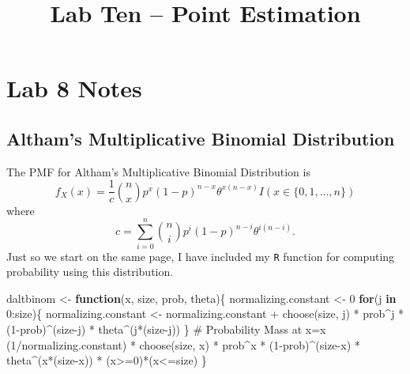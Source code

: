 \documentclass[
]{article}
\title{Lab Ten -- Point Estimation}
\author{}
\date{}
\newenvironment{Shaded}{\begin{snugshade}}{\end{snugshade}}
\newcommand{\CommentTok}[1]{\textcolor[rgb]{0.37,0.37,0.37}{#1}}
\newcommand{\ControlFlowTok}[1]{\textcolor[rgb]{0.00,0.23,0.31}{\textbf{#1}}}
\newcommand{\DecValTok}[1]{\textcolor[rgb]{0.68,0.00,0.00}{#1}}
\newcommand{\FunctionTok}[1]{\textcolor[rgb]{0.28,0.35,0.67}{#1}}
\newcommand{\NormalTok}[1]{\textcolor[rgb]{0.00,0.23,0.31}{#1}}
\newcommand{\OtherTok}[1]{\textcolor[rgb]{0.00,0.23,0.31}{#1}}
\newcommand{\SpecialCharTok}[1]{\textcolor[rgb]{0.37,0.37,0.37}{#1}}
\begin{document}
\maketitle


\normalsize

\normalsize

\section{Lab 8 Notes}\label{lab-8-notes}

\subsection{Altham's Multiplicative Binomial
Distribution}\label{althams-multiplicative-binomial-distribution}

The PMF for Altham's Multiplicative Binomial Distribution is
\[f_X(x) = \frac{1}{c} {n \choose x} p^x (1-p)^{n-x} \theta^{x(n-x)}I(x \in \{0, 1, ..., n\})\]
where
\[c = \sum_{i=0}^n {n \choose i} p^i (1-p)^{n-i} \theta^{i(n-i)}.\] Just
so we start on the same page, I have included my \texttt{R} function for
computing probability using this distribution.

\normalsize

\begin{Shaded}
\begin{Highlighting}[numbers=left,,]
\NormalTok{daltbinom }\OtherTok{\textless{}{-}} \ControlFlowTok{function}\NormalTok{(x, size, prob, theta)\{}
\NormalTok{  normalizing.constant }\OtherTok{\textless{}{-}} \DecValTok{0}
  \ControlFlowTok{for}\NormalTok{(j }\ControlFlowTok{in} \DecValTok{0}\SpecialCharTok{:}\NormalTok{size)\{}
\NormalTok{    normalizing.constant }\OtherTok{\textless{}{-}}\NormalTok{ normalizing.constant }\SpecialCharTok{+} 
      \FunctionTok{choose}\NormalTok{(size, j) }\SpecialCharTok{*}\NormalTok{ prob}\SpecialCharTok{\^{}}\NormalTok{j }\SpecialCharTok{*}\NormalTok{ (}\DecValTok{1}\SpecialCharTok{{-}}\NormalTok{prob)}\SpecialCharTok{\^{}}\NormalTok{(size}\SpecialCharTok{{-}}\NormalTok{j) }\SpecialCharTok{*}\NormalTok{ theta}\SpecialCharTok{\^{}}\NormalTok{(j}\SpecialCharTok{*}\NormalTok{(size}\SpecialCharTok{{-}}\NormalTok{j))}
\NormalTok{  \}}
  \CommentTok{\# Probability Mass at x=x}
\NormalTok{  (}\DecValTok{1}\SpecialCharTok{/}\NormalTok{normalizing.constant) }\SpecialCharTok{*}
    \FunctionTok{choose}\NormalTok{(size, x) }\SpecialCharTok{*}\NormalTok{ prob}\SpecialCharTok{\^{}}\NormalTok{x }\SpecialCharTok{*}\NormalTok{ (}\DecValTok{1}\SpecialCharTok{{-}}\NormalTok{prob)}\SpecialCharTok{\^{}}\NormalTok{(size}\SpecialCharTok{{-}}\NormalTok{x) }\SpecialCharTok{*}\NormalTok{ theta}\SpecialCharTok{\^{}}\NormalTok{(x}\SpecialCharTok{*}\NormalTok{(size}\SpecialCharTok{{-}}\NormalTok{x)) }\SpecialCharTok{*}
\NormalTok{      (x}\SpecialCharTok{\textgreater{}=}\DecValTok{0}\NormalTok{)}\SpecialCharTok{*}\NormalTok{(x}\SpecialCharTok{\textless{}=}\NormalTok{size)}
\NormalTok{\}}
\end{Highlighting}
\end{Shaded}
\end{document}

